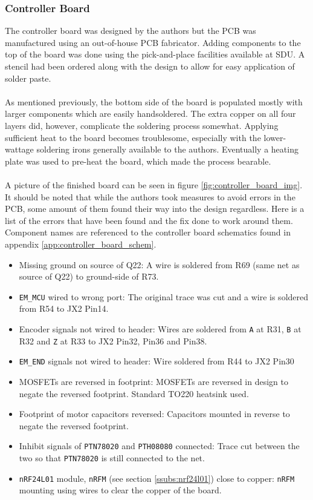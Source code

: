 \subsubsection{Controller Board} %
\label{ssub:controller_board}
The controller board was designed by the authors but the PCB was manufactured using an out-of-house PCB fabricator.
Adding components to the top of the board was done using the pick-and-place facilities available at SDU.
A stencil had been ordered along with the design to allow for easy application of solder paste.
\\~\\
As mentioned previously, the bottom side of the board is populated mostly with larger components which are easily handsoldered.
The extra copper on all four layers did, however, complicate the soldering process somewhat.
Applying sufficient heat to the board becomes troublesome, especially with the lower-wattage soldering irons generally available to the authors.
Eventually a heating plate was used to pre-heat the board, which made the process bearable.
\\~\\
A picture of the finished board can be seen in figure \ref{fig:controller_board_img}.
It should be noted that while the authors took measures to avoid errors in the PCB, some amount of them found their way into the design regardless.
Here is a list of the errors that have been found and the fix done to work around them.
Component names are referenced to the controller board schematics found in appendix \ref{app:controller_board_schem}.
\begin{itemize}
	\item Missing ground on source of Q22: A wire is soldered from R69 (same net as source of Q22) to ground-side of R73.
	\item \texttt{EM\_MCU} wired to wrong port: The original trace was cut and a wire is soldered from R54 to JX2 Pin14.
	\item Encoder signals not wired to header: Wires are soldered from \texttt{A} at R31, \texttt{B} at R32 and \texttt{Z} at R33 to JX2 Pin32, Pin36 and Pin38.
	\item \texttt{EM\_END} signals not wired to header: Wire soldered from R44 to JX2 Pin30
	\item MOSFETs are reversed in footprint: MOSFETs are reversed in design to negate the reversed footprint.
	Standard TO220 heatsink used.
	\item Footprint of motor capacitors reversed: Capacitors mounted in reverse to negate the reversed footprint.
	\item Inhibit signals of \texttt{PTN78020} and \texttt{PTH08080} connected: Trace cut between the two so that \texttt{PTN78020} is still connected to the net.
	\item \texttt{nRF24L01} module, \texttt{nRFM} (see section \ref{ssubs:nrf24l01}) close to copper: \texttt{nRFM} mounting using wires to clear the copper of the board.
\end{itemize}
